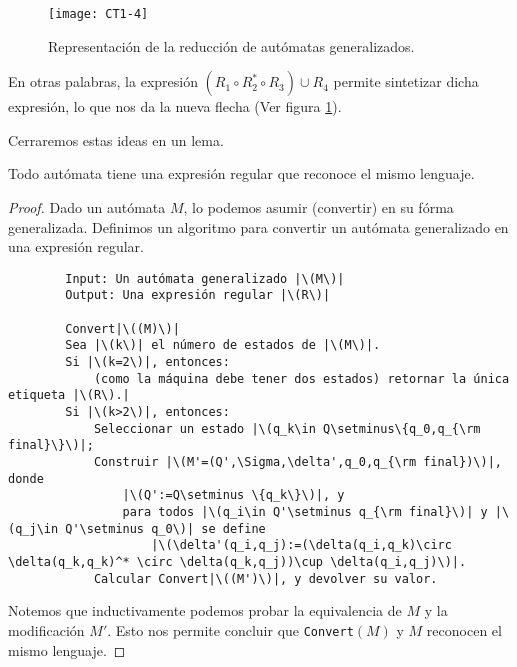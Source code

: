 \begin{figure}[h!b]
    \centering
    \texttt{[image: CT1-4]}
    \caption{Representaci\'on de la reducci\'on de aut\'omatas generalizados.}\label{CT1-4}
\end{figure}

En otras palabras, la expresi\'on \( (R_1\circ R_2^* \circ R_3) \cup R_4\) permite sintetizar dicha expresi\'on, lo que nos da la nueva flecha (Ver figura \ref{CT1-4}).

Cerraremos estas ideas en un lema.

\begin{lema}
    Todo aut\'omata tiene una expresi\'on regular que reconoce el mismo lenguaje.
\end{lema}

\begin{proof}
    Dado un aut\'omata \(M\), lo podemos asumir (convertir) en su f\'orma generalizada. Definimos un algoritmo para convertir un aut\'omata generalizado en una expresi\'on regular.

    \begin{code}
        \begin{verbatim}
        Input: Un autómata generalizado |\(M\)|
        Output: Una expresión regular |\(R\)|
        
        Convert|\((M)\)|
        Sea |\(k\)| el número de estados de |\(M\)|.
        Si |\(k=2\)|, entonces:
            (como la máquina debe tener dos estados) retornar la única etiqueta |\(R\).|
        Si |\(k>2\)|, entonces:
            Seleccionar un estado |\(q_k\in Q\setminus\{q_0,q_{\rm final}\}\)|;
            Construir |\(M'=(Q',\Sigma,\delta',q_0,q_{\rm final})\)|, donde
                |\(Q':=Q\setminus \{q_k\}\)|, y 
                para todos |\(q_i\in Q'\setminus q_{\rm final}\)| y |\(q_j\in Q'\setminus q_0\)| se define
                    |\(\delta'(q_i,q_j):=(\delta(q_i,q_k)\circ \delta(q_k,q_k)^* \circ \delta(q_k,q_j))\cup \delta(q_i,q_j)\)|.
            Calcular Convert|\((M')\)|, y devolver su valor.        
        \end{verbatim}
        \caption{Algoritmo {\tt Convert}\((M)\).}
    \end{code}

    Notemos que inductivamente podemos probar la equivalencia de \(M\) y la modificaci\'on \(M'.\)
    Esto nos permite concluir que {\tt Convert}\((M)\) y \(M\) reconocen el mismo lenguaje.
\end{proof}

